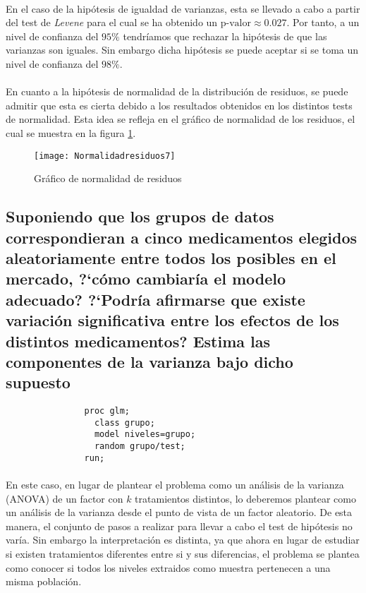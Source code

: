 \documentclass{article}
\begin{document}
      \paragraph{}
      En el caso de la hipótesis de igualdad de varianzas, esta se llevado a cabo a partir del test de \emph{Levene} para el cual se ha obtenido un $\text{p-valor} \approx 0.027$. Por tanto, a un nivel de confianza del $95\%$ tendríamos que rechazar la hipótesis de que las varianzas son iguales. Sin embargo dicha hipótesis se puede aceptar si se toma un nivel de confianza del $98\%$.

      \paragraph{}
      En cuanto a la hipótesis de normalidad de la distribución de residuos, se puede admitir que esta es cierta debido a los resultados obtenidos en los distintos tests de normalidad. Esta idea se refleja en el gráfico de normalidad de los residuos, el cual se muestra en la figura \ref{fig:figura_2}.

      \begin{figure}[H]
        \centering
        \texttt{[image: Normalidadresiduos7]}
        \caption{Gráfico de normalidad de residuos}
        \label{fig:figura_2}
      \end{figure}



    \subsection{Suponiendo que los grupos de datos correspondieran a cinco medicamentos elegidos aleatoriamente entre todos los posibles en el mercado, ?`cómo cambiaría el modelo adecuado? ?`Podría afirmarse que existe variación significativa entre los efectos de los distintos medicamentos? Estima las componentes de la varianza bajo dicho supuesto}


      \begin{figure}[h]
        \centering
        \begin{verbatim}
          proc glm;
            class grupo;
            model niveles=grupo;
            random grupo/test;
          run;
        \end{verbatim}
        \caption{}
        \label{code:sas_8}
      \end{figure}

      \paragraph{}
      En este caso, en lugar de plantear el problema como un análisis de la varianza (ANOVA) de un factor con $k$ tratamientos distintos, lo deberemos plantear como un análisis de la varianza desde el punto de vista de un factor aleatorio. De esta manera, el conjunto de pasos a realizar para llevar a cabo el test de hipótesis no varía. Sin embargo la interpretación es distinta, ya que ahora en lugar de estudiar si existen tratamientos diferentes entre si y sus diferencias, el problema se plantea como conocer si todos los niveles extraidos como muestra pertenecen a una misma población.
\end{document}
